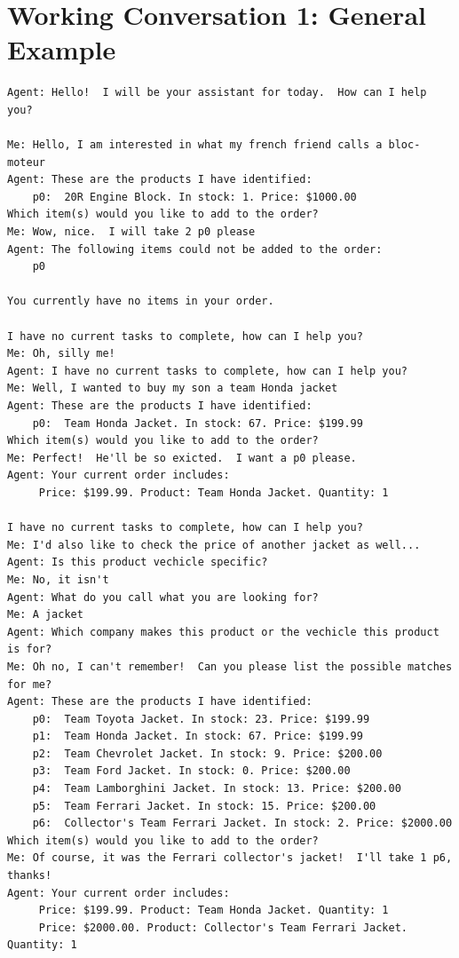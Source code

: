 \documentclass[11pt, titlepage]{article}
\author{Graeme Douglas (76316090)}
\begin{document}
\section{Working Conversation 1: General Example}

\begin{lstlisting}
Agent: Hello!  I will be your assistant for today.  How can I help you?

Me: Hello, I am interested in what my french friend calls a bloc-moteur
Agent: These are the products I have identified:
	p0:	 20R Engine Block. In stock: 1. Price: $1000.00
Which item(s) would you like to add to the order?
Me: Wow, nice.  I will take 2 p0 please
Agent: The following items could not be added to the order:
	p0

You currently have no items in your order.

I have no current tasks to complete, how can I help you?
Me: Oh, silly me!
Agent: I have no current tasks to complete, how can I help you?
Me: Well, I wanted to buy my son a team Honda jacket
Agent: These are the products I have identified:
	p0:	 Team Honda Jacket. In stock: 67. Price: $199.99
Which item(s) would you like to add to the order?
Me: Perfect!  He'll be so exicted.  I want a p0 please.
Agent: Your current order includes:
	 Price: $199.99. Product: Team Honda Jacket. Quantity: 1

I have no current tasks to complete, how can I help you?
Me: I'd also like to check the price of another jacket as well...
Agent: Is this product vechicle specific?
Me: No, it isn't
Agent: What do you call what you are looking for?
Me: A jacket
Agent: Which company makes this product or the vechicle this product is for?
Me: Oh no, I can't remember!  Can you please list the possible matches for me?
Agent: These are the products I have identified:
	p0:	 Team Toyota Jacket. In stock: 23. Price: $199.99
	p1:	 Team Honda Jacket. In stock: 67. Price: $199.99
	p2:	 Team Chevrolet Jacket. In stock: 9. Price: $200.00
	p3:	 Team Ford Jacket. In stock: 0. Price: $200.00
	p4:	 Team Lamborghini Jacket. In stock: 13. Price: $200.00
	p5:	 Team Ferrari Jacket. In stock: 15. Price: $200.00
	p6:	 Collector's Team Ferrari Jacket. In stock: 2. Price: $2000.00
Which item(s) would you like to add to the order?
Me: Of course, it was the Ferrari collector's jacket!  I'll take 1 p6, thanks!
Agent: Your current order includes:
	 Price: $199.99. Product: Team Honda Jacket. Quantity: 1
	 Price: $2000.00. Product: Collector's Team Ferrari Jacket. Quantity: 1


\end{lstlisting}
\end{document}
